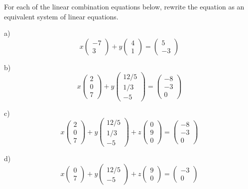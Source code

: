 \documentclass[cahier-main.tex]{subfiles}
\begin{document}
\begin{task}
For each of the linear combination equations below, rewrite the equation as an equivalent system of linear equations.
\begin{compactitem}
\item[a)] 
\[
x \begin{pmatrix} -7\\ 3\end{pmatrix} + y \begin{pmatrix} 4\\ 1\end{pmatrix} = \begin{pmatrix} 5\\-3 \end{pmatrix}
\]

\item[b)]
\[
x \begin{pmatrix} 2\\ 0\\ 7\end{pmatrix} + y \begin{pmatrix} 12/5\\ 1/3\\ -5\end{pmatrix} = \begin{pmatrix} -8\\-3 \\ 0\end{pmatrix}
\]

\item[c)]
\[
x \begin{pmatrix} 2\\ 0\\ 7\end{pmatrix} + y \begin{pmatrix} 12/5\\ 1/3\\ -5\end{pmatrix} + z \begin{pmatrix} 0 \\ 9 \\ 0\end{pmatrix} = \begin{pmatrix} -8\\-3 \\ 0\end{pmatrix}
\]

\item[d)]
\[x \begin{pmatrix} 0\\ 7\end{pmatrix} + y \begin{pmatrix} 12/5\\ -5\end{pmatrix} + z \begin{pmatrix} 9 \\ 0\end{pmatrix}= \begin{pmatrix} -3 \\ 0\end{pmatrix}
\]

\end{compactitem}
\end{task}
\end{document}
